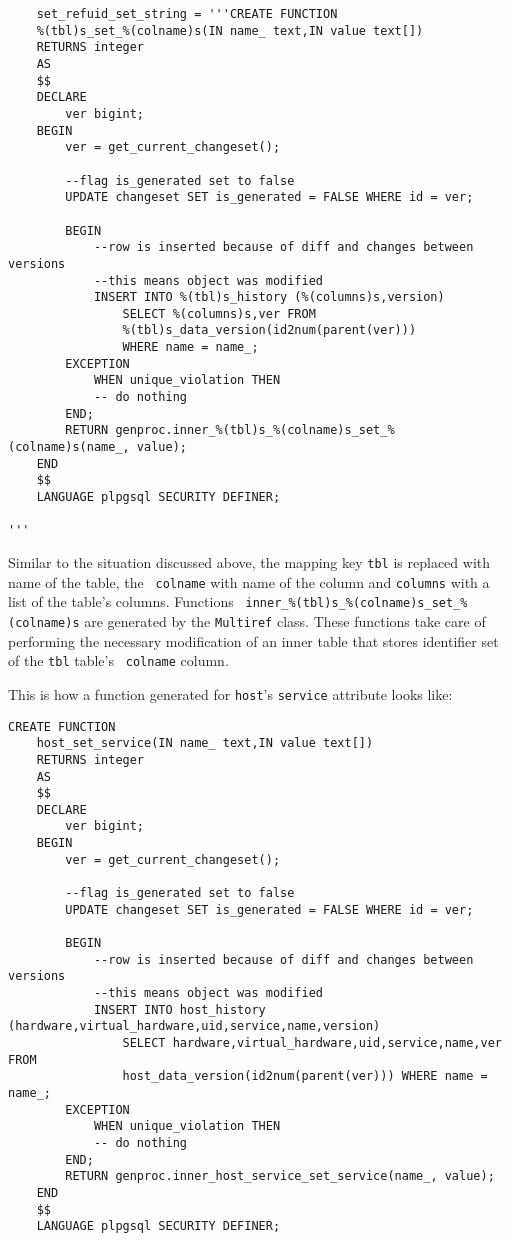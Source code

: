 \documentclass[deska]{subfiles}
\begin{document}
\begin{verbatim}
    set_refuid_set_string = '''CREATE FUNCTION
    %(tbl)s_set_%(colname)s(IN name_ text,IN value text[])
    RETURNS integer
    AS
    $$
    DECLARE
        ver bigint;
    BEGIN
        ver = get_current_changeset();

        --flag is_generated set to false
        UPDATE changeset SET is_generated = FALSE WHERE id = ver;

        BEGIN
            --row is inserted because of diff and changes between versions
            --this means object was modified
            INSERT INTO %(tbl)s_history (%(columns)s,version)
                SELECT %(columns)s,ver FROM
                %(tbl)s_data_version(id2num(parent(ver)))
                WHERE name = name_;
        EXCEPTION
            WHEN unique_violation THEN
            -- do nothing
        END;
        RETURN genproc.inner_%(tbl)s_%(colname)s_set_%(colname)s(name_, value);
    END
    $$
    LANGUAGE plpgsql SECURITY DEFINER;

'''
\end{verbatim}

Similar to the situation discussed above, the mapping key {\tt tbl} is replaced with name of the table, the {\tt
colname} with name of the column and {\tt columns} with a list of the table's columns.  Functions {\tt
inner\_\%(tbl)s\_\%(colname)s\_set\_\%(colname)s} are generated by the {\tt Multiref} class.   These functions take care
of performing the necessary modification of an inner table that stores identifier set of the {\tt tbl} table's {\tt
colname} column.

This is how a function generated for {\tt host}'s {\tt service} attribute looks like:

\begin{verbatim}
CREATE FUNCTION
    host_set_service(IN name_ text,IN value text[])
    RETURNS integer
    AS
    $$
    DECLARE
        ver bigint;
    BEGIN
        ver = get_current_changeset();

        --flag is_generated set to false
        UPDATE changeset SET is_generated = FALSE WHERE id = ver;

        BEGIN
            --row is inserted because of diff and changes between versions
            --this means object was modified
            INSERT INTO host_history (hardware,virtual_hardware,uid,service,name,version)
                SELECT hardware,virtual_hardware,uid,service,name,ver FROM
                host_data_version(id2num(parent(ver))) WHERE name = name_;
        EXCEPTION
            WHEN unique_violation THEN
            -- do nothing
        END;
        RETURN genproc.inner_host_service_set_service(name_, value);
    END
    $$
    LANGUAGE plpgsql SECURITY DEFINER;
\end{verbatim}
\end{document}
